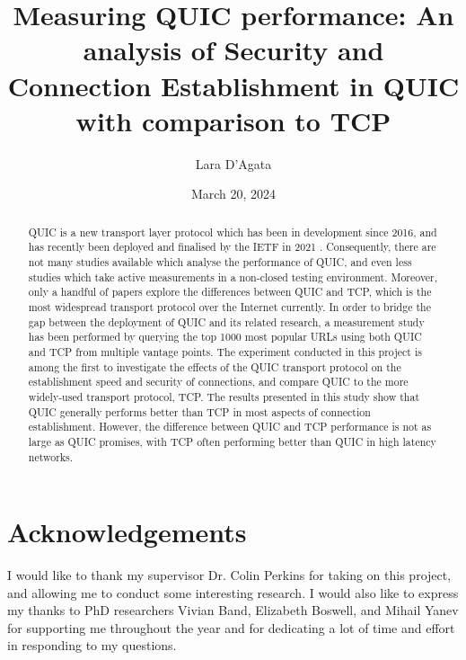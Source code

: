 \documentclass{l4proj}
\begin{document}
\title{Measuring QUIC performance: An analysis of Security and Connection Establishment in QUIC with comparison to TCP}
\author{Lara D'Agata}
\date{March 20, 2024}

\maketitle

\begin{abstract}

QUIC is a new transport layer protocol which has been in development since 2016, and has recently been deployed and finalised by the IETF in 2021 \citep{Iyen2021}. Consequently, there are not many studies available which analyse the performance of QUIC, and even less studies which take active measurements in a non-closed testing environment. Moreover, only a handful of papers explore the differences between QUIC and TCP, which is the most widespread transport protocol over the Internet currently. In order to bridge the gap between the deployment of QUIC and its related research, a measurement study has been performed by querying the top 1000 most popular URLs using both QUIC and TCP from multiple vantage points. The experiment conducted in this project is among the first to investigate the effects of the QUIC transport protocol on the establishment speed and security of connections, and compare QUIC to the more widely-used transport protocol, TCP. The results presented in this study show that QUIC generally performs better than TCP in most aspects of connection establishment. However, the difference between QUIC and TCP performance is not as large as QUIC promises, with TCP often performing better than QUIC in high latency networks.


\end{abstract}

\chapter*{Acknowledgements}

I would like to thank my supervisor Dr. Colin Perkins for taking on this project, and allowing me to conduct some interesting research. I would also like to express my thanks to PhD researchers Vivian Band, Elizabeth Boswell, and Mihail Yanev for supporting me throughout the year and for dedicating a lot of time and effort in responding to my questions.
\end{document}
